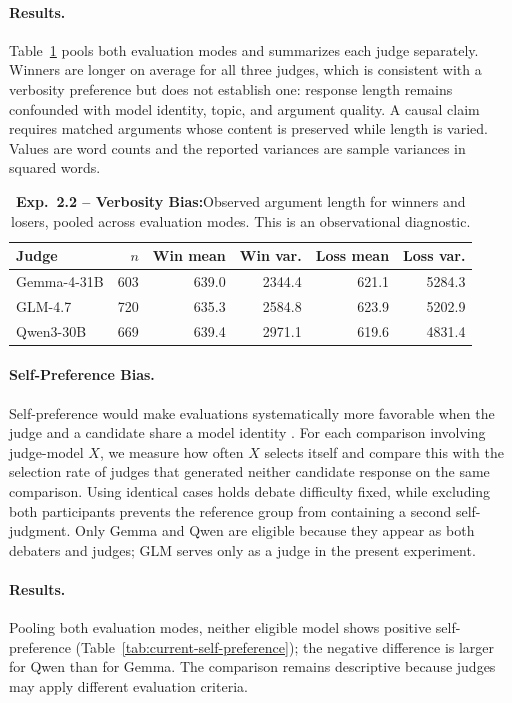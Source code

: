 \documentclass{article}
\begin{document}
\paragraph{Results.}
Table~\ref{tab:current-verbosity} pools both evaluation modes and summarizes each judge separately. Winners are longer on average for all three judges, which is consistent with a verbosity preference but does not establish one: response length remains confounded with model identity, topic, and argument quality. A causal claim requires matched arguments whose content is preserved while length is varied. Values are word counts and the reported variances are sample variances in squared words.

\begin{table}[!t]
  \centering
  \caption{\textbf{Exp.~2.2 -- Verbosity Bias:}\enspace Observed argument length for winners and losers, pooled across evaluation modes. This is an observational diagnostic.}
  \label{tab:current-verbosity}
  \begin{tabular}{p{8em}rrrrr}
    \toprule
    Judge & $n$ & Win mean & Win var. & Loss mean & Loss var. \\
    \midrule
    Gemma-4-31B & 603 & 639.0 & 2344.4 & 621.1 & 5284.3 \\
    GLM-4.7 & 720 & 635.3 & 2584.8 & 623.9 & 5202.9 \\
    Qwen3-30B & 669 & 639.4 & 2971.1 & 619.6 & 4831.4 \\
    \bottomrule
  \end{tabular}
\end{table}

\paragraph{Self-Preference Bias.}
Self-preference would make evaluations systematically more favorable when the judge and a candidate share a model identity \citep{panickssery2024selfpreference}. For each comparison involving judge-model $X$, we measure how often $X$ selects itself and compare this with the selection rate of judges that generated neither candidate response on the same comparison. Using identical cases holds debate difficulty fixed, while excluding both participants prevents the reference group from containing a second self-judgment. Only Gemma and Qwen are eligible because they appear as both debaters and judges; GLM serves only as a judge in the present experiment.

\paragraph{Results.}
Pooling both evaluation modes, neither eligible model shows positive self-preference (Table~\ref{tab:current-self-preference}); the negative difference is larger for Qwen than for Gemma. The comparison remains descriptive because judges may apply different evaluation criteria.
\end{document}
